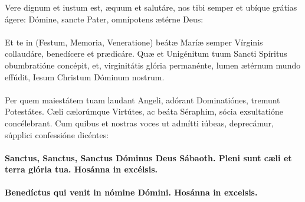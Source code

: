 \documentclass[12pt, a4paper]{article}
\begin{document}
	\\
	\\
	\\
	\\
	\\
	Vere dignum et iustum est, æquum
	et salutáre, nos tibi semper et
	ubíque grátias ágere: Dómine,
	sancte Pater, omnípotens ætérne
	Deus:
	\\\\
	Et te in (Festum, Memoria,
	Veneratione) beátæ Maríæ semper
	Vírginis collaudáre, benedícere et
	prædicáre. Quæ et Unigénitum
	tuum Sancti Spíritus obumbratióne
	concépit, et, virginitátis glória
	permanénte, lumen ætérnum
	mundo effúdit, Iesum Christum
	Dóminum nostrum.
	\\\\
	Per quem maiestátem tuam laudant
	Angeli, adórant Dominatiónes,
	tremunt Potestátes. Cæli
	cælorúmque Virtútes, ac beáta
	Séraphim, sócia exsultatióne
	concélebrant. Cum quibus et
	nostras voces ut admítti iúbeas,
	deprecámur, súpplici confessióne
	dicéntes:
	\\\\
	\textbf{Sanctus, Sanctus, Sanctus Dóminus
		Deus Sábaoth. Pleni sunt cæli et
		terra glória tua. Hosánna in
		excélsis.}
	\\\\
	\textbf{Benedíctus qui venit in nómine
		Dómini. Hosánna in excelsis.}
	
	\newpage
	
\end{document}
